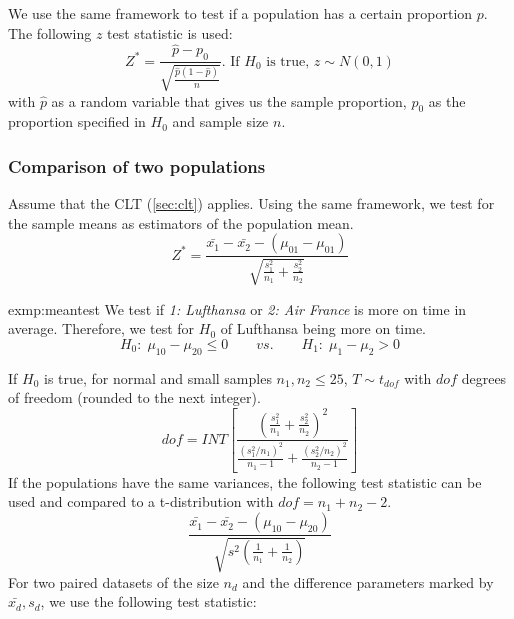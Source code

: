 			We use the same framework to test if a population has a certain proportion $p$. The following $z$ test statistic is used:
			\begin{equation*}
				Z^*=\frac{\hat{p}-p_0}{\sqrt{\frac{\hat{p}(1-\hat{p})}{n}}}\text{. If $H_0$ is true, }z\sim N(0,1)
			\end{equation*}		
			with $\hat{p}$ as a random variable that gives us the sample proportion, $p_0$ as the proportion specified in $H_0$ and sample size $n$.
	\subsubsection{Comparison of two populations}
			Assume that the CLT (\ref{sec:clt}) applies. Using the same framework, we test for the sample means as estimators of the population mean.
			\begin{equation*}
				Z^*=\frac{\bar{x_1}-\bar{x_2}-(\mu_{01}-\mu_{01})}{\sqrt{\frac{s_1^2}{n_1}+\frac{s_2^2}{n_2}}}
			\end{equation*}
			\begin{exmp}{exmp:meantest}
				We test if \emph{1: Lufthansa} or \emph{2: Air France} is more on time in average. Therefore, we test for $H_0$ of Lufthansa being more on time.
				\begin{equation*}
					H_0:\;\mu_{10}-\mu_{20}\leq 0\qquad vs. \qquad H_1:\;\mu_1-\mu_2>0
				\end{equation*}
			\end{exmp}
			If $H_0$ is true, for normal and small samples $n_1,n_2\leq 25$, $T\sim t_{dof}$ with $dof$ degrees of freedom (rounded to the next integer).
			\begin{equation*}
				dof=INT\left[\frac{\left(\frac{s_1^2}{n_1}+\frac{s_2^2}{n_2}\right)^2}{\frac{(s_1^2/n_1)^2}{n_1-1}+\frac{(s_2^2/n_2)^2}{n_2-1}}\right]
			\end{equation*}	
			If the populations have the same variances, the following test statistic can be used and compared to a t-distribution with $dof=n_1+n_2-2$.
			\begin{equation*}
				\frac{\bar{x_1}-\bar{x_2}-(\mu_{10}-\mu_{20})}{\sqrt{s^2\left(\frac{1}{n_1}+\frac{1}{n_2}\right)}}
			\end{equation*}
			For two paired datasets of the size $n_d$ and the difference parameters marked by $\bar{x_d},s_d$, we use the following test statistic:
